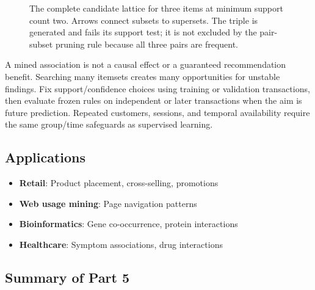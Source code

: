 \documentclass[11pt,twoside]{article}
\numberwithin{equation}{section}
\theoremstyle{plain}
\theoremstyle{definition}
\theoremstyle{remark}
\begin{document}
\begin{figure}[H]
\centering
{}
\caption{The complete candidate lattice for three items at minimum support count two. Arrows connect subsets to supersets. The triple is generated and fails its support test; it is not excluded by the pair-subset pruning rule because all three pairs are frequent.}
\end{figure}
A mined association is not a causal effect or a guaranteed recommendation benefit. Searching many itemsets creates many opportunities for unstable findings. Fix support/confidence choices using training or validation transactions, then evaluate frozen rules on independent or later transactions when the aim is future prediction. Repeated customers, sessions, and temporal availability require the same group/time safeguards as supervised learning.

\subsection{Applications}

\begin{itemize}
\item \textbf{Retail}: Product placement, cross-selling, promotions
\item \textbf{Web usage mining}: Page navigation patterns
\item \textbf{Bioinformatics}: Gene co-occurrence, protein interactions
\item \textbf{Healthcare}: Symptom associations, drug interactions
\end{itemize}

\subsection{Summary of Part 5}
\end{document}
